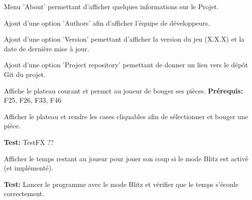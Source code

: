 \documentclass{article}
\begin{document}
\begin{needbox}
    Menu 'About' permettant d'afficher quelques informations sur le Projet.
    \begin{subneedbox}[F49.1: Auteurs]
        Ajout d'une option 'Authors' afin d'afficher l'équipe de développeurs.
    \end{subneedbox}
    \begin{subneedbox}
        Ajout d'une option 'Version' pemettant d'afficher la version du jeu (X.X.X) et la date de dernière mise à jour.
    \end{subneedbox}
    \begin{subneedbox}
        Ajout d'une option 'Project repository' pemettant de donner un lien vers le dépôt Git du projet.
    \end{subneedbox}
\end{needbox}

\begin{needbox}
    Affiche le plateau courant et permet au joueur de bouger ses pièces.
    \textbf{Prérequis:} F25, F26, F33, F46
    \begin{subneedbox}
        Afficher le plateau et rendre les cases cliquables afin de sélectionner et 
        bouger une pièce.

        \textbf{Test:} TestFX ??
    \end{subneedbox}
    \begin{subneedbox}
        Afficher le temps restant au joueur pour jouer son coup si le mode Blitz est activé (et implémenté).

        \textbf{Test:} Lancer le programme avec le mode Blitz et vérifier que le temps s'écoule correctement.
    \end{subneedbox}
\end{needbox}
\end{document}
